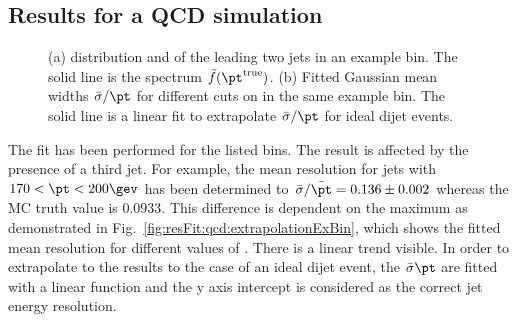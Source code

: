 \documentclass[a4paper]{cmspaper} %
\newcommand{\truth}{\ensuremath{\pt^{\text{true}}}\xspace}
\begin{document}
\subsection{Results for a QCD simulation}
\begin{figure}[ht]
  \begin{center}
     
  \end{center}
  \caption{(a) \ptgen distribution and of the leading two jets in an example \pt bin.
    The solid line is the spectrum $\tilde{f}(\truth)$.
    (b) Fitted Gaussian mean widths $\bar{\sigma}/\pt$ for different cuts on \ptrel in the same example \pt bin.
    The solid line is a linear fit to extrapolate $\bar{\sigma}/\pt$ for ideal dijet events.}
\end{figure}

The fit has been performed for the listed \pt bins.
The result is affected by the presence of a third jet.
For example, the mean resolution for jets with \mbox{$170 < \pt < 200\gev$} has been determined to \mbox{$\bar{\sigma}/\bar{\pt} = 0.136 \pm 0.002$} whereas the MC truth value is \mbox{$0.0933$}.
This difference is dependent on the maximum \ptrel as demonstrated in Fig.~\ref{fig:resFit:qcd:extrapolationExBin}, which shows the fitted mean resolution for different values of \ptrel.
There is a linear trend visible.
In order to extrapolate to the results to the case of an ideal dijet event, the $\bar{\sigma}\/\pt$ are fitted with a linear function and the y axis intercept is considered as the correct jet energy resolution.
\end{document}
